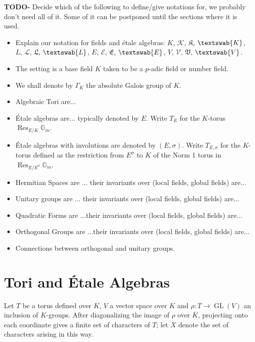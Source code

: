 \documentclass{article}
\theoremstyle{plain}
\theoremstyle{definition}
\numberwithin{equation}{section}
\DeclareMathOperator{\Res}{Res}
\DeclareMathOperator{\GL}{GL}
\newcommand{\Gm}{\mathbb{G}_m}
\newcommand{\GalKbK}{\Gamma_K}
\newcommand{\Kb}{\overline{K}}
\newcommand{\TODO}[1]{\textbf{TODO-#1}}
\newcommand{\aK}{K}
\newcommand{\gK}{\mathcal{K}}
\newcommand{\lK}{\mathfrak{K}}
\newcommand{\fK}{\textswab{K}}
\newcommand{\aL}{L}
\newcommand{\gL}{\mathcal{L}}
\newcommand{\lL}{\mathfrak{L}}
\newcommand{\fL}{\textswab{L}}
\newcommand{\aE}{E}
\newcommand{\gE}{\mathcal{E}}
\newcommand{\lE}{\mathfrak{E}}
\newcommand{\fE}{\textswab{E}}
\newcommand{\aV}{V}
\newcommand{\gV}{\mathcal{V}}
\newcommand{\lV}{\mathfrak{V}}
\newcommand{\fV}{\textswab{V}}
\begin{document}
\TODO{} Decide which of the following to define/give notations for, we probably don't need all of it. Some of it can be postponed until the sections where it is used.
\begin{itemize}
\item Explain our notation for fields and \'etale algebras: $\aK$, $\gK$, $\lK$, $\fK$, $\aL$, $\gL$, $\lL$, $\fL$, $\aE$, $\gE$, $\lE$, $\fE$, $\aV$, $\gV$, $\lV$, $\fV$.
\item The setting is a base field $K$ taken to be a $p$-adic field or number field.
\item We shall denote by $\GalKbK$ the absolute Galois group of $K$.
\item Algebraic Tori are... 
\item \'Etale algebras are... typically denoted by $E$.  Write $T_E$ for the $K$-torus $\Res_{E/K} \Gm$.
\item \'Etale algebras with involutions are denoted by $(E, \sigma)$.  Write $T_{E, \sigma}$ for the $K$-torus defined as the restriction from $E^\sigma$ to $K$ of the Norm 1 torus in $\Res_{E/E^\sigma} \Gm$.
\item Hermitian Spaces are ... their invariants over (local fields, global fields) are...
\item Unitary groups are ... their invariants over (local fields, global fields) are...
\item Quadratic Forms are ...their invariants over (local fields, global fields) are...
\item Orthogonal Groups are ...their invariants over (local fields, global fields) are...
\item Connections between orthogonal and unitary groups.
\end{itemize}


\section{Tori and \'Etale Algebras}

Let $T$ be a torus defined over $K$, $V$ a vector space over $K$ and $\rho : T \rightarrow \GL(V)$ an inclusion of $K$-groups.  After diagonalizing the image of $\rho$ over $\Kb$, projecting onto each coordinate gives a finite set of characters of $T$; let $X$ denote the set of characters arising in this way. 
\end{document}
